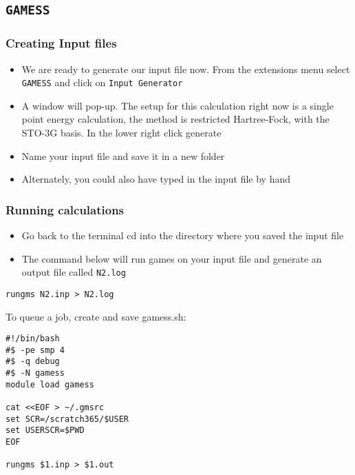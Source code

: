 \documentclass[11pt]{article}
\begin{document}
\subsection{\texttt{GAMESS}}
\label{sec:org9244e65}

\subsubsection{Creating Input files}
\label{sec:orgc795a3e}

\begin{itemize}
\item We are ready to generate our input file now. From the extensions menu select \texttt{GAMESS} and click on \texttt{Input Generator}

\item A window will pop-up. The setup for this calculation right now is a single point energy calculation, the method is restricted Hartree-Fock, with the STO-3G basis. In the lower right click generate

\item Name your input file and save it in a new folder

\item Alternately, you could also have typed in the input file by hand
\end{itemize}

\subsubsection{Running calculations}
\label{sec:org287912e}

\begin{itemize}
\item Go back to the terminal cd into the directory where you saved the input file

\item The command below will run games on your input file and generate an output file called \texttt{N2.log}
\end{itemize}

\begin{verbatim}
rungms N2.inp > N2.log
\end{verbatim}

To queue a job, create and save gamess.sh:
\begin{verbatim}
#!/bin/bash
#$ -pe smp 4
#$ -q debug
#$ -N gamess
module load gamess

cat <<EOF > ~/.gmsrc
set SCR=/scratch365/$USER
set USERSCR=$PWD
EOF

rungms $1.inp > $1.out
\end{verbatim}
\end{document}

